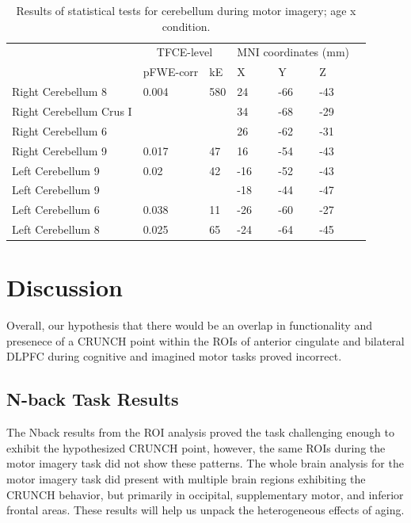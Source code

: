 \documentclass[a4paper,fleqn]{cas-sc}
\begin{document}
\begin{table}[]
\centering
\caption{Results of statistical tests for cerebellum during motor imagery; age x condition. }
\label{tab:MotorImagery_cerebellum_interaction}
\begin{tabular}{lllllll}

         & \multicolumn{2}{c}{TFCE-level} & \multicolumn{3}{c}{MNI coordinates (mm)} &  \\
  & pFWE-corr         & kE         & X            & Y           & Z           &  \\ 
Right Cerebellum 8                        & 0.004             & 580        & 24           & -66         & -43         &  \\
Right Cerebellum Crus I                   &                   &            & 34           & -68         & -29         &  \\
Right Cerebellum 6                        &                   &            & 26           & -62         & -31         &  \\
Right Cerebellum 9                        & 0.017             & 47         & 16           & -54         & -43         &  \\
Left Cerebellum 9                         & 0.02              & 42         & -16          & -52         & -43         &  \\
Left Cerebellum 9                         &                   &            & -18          & -44         & -47         &  \\
Left Cerebellum 6                         & 0.038             & 11         & -26          & -60         & -27         &  \\
Left Cerebellum 8 & 0.025             & 65         & -24          & -64         & -45         &  
\end{tabular}
\end{table}


\section{Discussion }
Overall, our hypothesis that there would be an overlap in functionality and presenece of a CRUNCH point within the ROIs of anterior cingulate and bilateral DLPFC during cognitive and imagined motor tasks proved incorrect.

\subsection{N-back Task Results}
The Nback results from the ROI analysis proved the task challenging enough to exhibit the hypothesized CRUNCH point, however, the same ROIs during the motor imagery task did not show these patterns.
The whole brain analysis for the motor imagery task did present with multiple brain regions exhibiting the CRUNCH behavior, but primarily in occipital, supplementary motor, and inferior frontal areas. 
These results will help us unpack the heterogeneous effects of aging.
\end{document}
